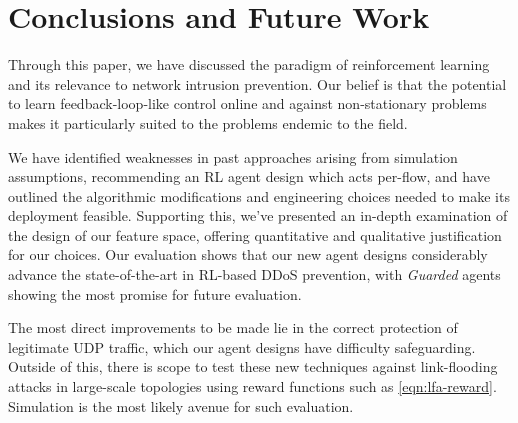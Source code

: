 \documentclass[10pt, times, comsoc]{IEEEtran}
\begin{document}

\section{Conclusions and Future Work}
Through this paper, we have discussed the paradigm of reinforcement learning and its relevance to network intrusion prevention.
Our belief is that the potential to learn feedback-loop-like control online and against non-stationary problems makes it particularly suited to the problems endemic to the field.

We have identified weaknesses in past approaches arising from simulation assumptions, recommending an RL agent design which acts per-flow, and have outlined the algorithmic modifications and engineering choices needed to make its deployment feasible.
Supporting this, we've presented an in-depth examination of the design of our feature space, offering quantitative and qualitative justification for our choices.
Our evaluation shows that our new agent designs considerably advance the state-of-the-art in RL-based DDoS prevention, with \emph{Guarded} agents showing the most promise for future evaluation.

The most direct improvements to be made lie in the correct protection of legitimate UDP traffic, which our agent designs have difficulty safeguarding.
Outside of this, there is scope to test these new techniques against link-flooding attacks in large-scale topologies using reward functions such as \cref{eqn:lfa-reward}.
Simulation is the most likely avenue for such evaluation.


\end{document}
